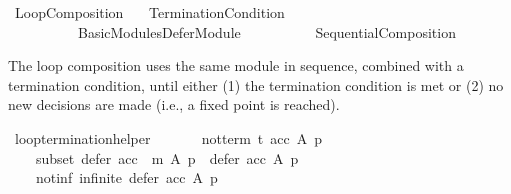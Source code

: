 %
\begin{isabellebody}%
%
%
\isadelimdocument
\isanewline
%
\endisadelimdocument
%
\isatagdocument
\isanewline
\isanewline
%
\isamarkuptrue%
%
\endisatagdocument
{\isafolddocument}%
%
\isadelimdocument
%
\endisadelimdocument
%
\isadelimtheory
%
\endisadelimtheory
%
\isatagtheory
{}\isamarkupfalse%
\ Loop{\isacharunderscore}{\kern0pt}Composition\isanewline
\ \ \ {\isachardoublequoteopen}{\isachardot}{\kern0pt}{\isachardot}{\kern0pt}{\isacharslash}{\kern0pt}Termination{\isacharunderscore}{\kern0pt}Condition{\isachardoublequoteclose}\isanewline
\ \ \ \ \ \ \ \ \ \ {\isachardoublequoteopen}{\isachardot}{\kern0pt}{\isachardot}{\kern0pt}{\isacharslash}{\kern0pt}Basic{\isacharunderscore}{\kern0pt}Modules{\isacharslash}{\kern0pt}Defer{\isacharunderscore}{\kern0pt}Module{\isachardoublequoteclose}\isanewline
\ \ \ \ \ \ \ \ \ \ Sequential{\isacharunderscore}{\kern0pt}Composition\isanewline
\isanewline
{}%
\endisatagtheory
{\isafoldtheory}%
%
\isadelimtheory
%
\endisadelimtheory
%
\begin{isamarkuptext}%
The loop composition uses the same module in sequence,
combined with a termination condition, until either
  (1) the termination condition is met or
  (2) no new decisions are made (i.e., a fixed point is reached).%
\end{isamarkuptext}\isamarkuptrue%
%
\isadelimdocument
%
\endisadelimdocument
%
\isatagdocument
%
\isamarkuptrue%
%
\endisatagdocument
{\isafolddocument}%
%
\isadelimdocument
%
\endisadelimdocument
{}\isamarkupfalse%
\ loop{\isacharunderscore}{\kern0pt}termination{\isacharunderscore}{\kern0pt}helper{\isacharcolon}{\kern0pt}\isanewline
\ \ \isanewline
\ \ \ \ not{\isacharunderscore}{\kern0pt}term{\isacharcolon}{\kern0pt}\ {\isachardoublequoteopen}{\isasymnot}t\ {\isacharparenleft}{\kern0pt}acc\ A\ p{\isacharparenright}{\kern0pt}{\isachardoublequoteclose}\ \isanewline
\ \ \ \ subset{\isacharcolon}{\kern0pt}\ {\isachardoublequoteopen}defer\ {\isacharparenleft}{\kern0pt}acc\ {\isasymtriangleright}\ m{\isacharparenright}{\kern0pt}\ A\ p\ {\isasymsubset}\ defer\ acc\ A\ p{\isachardoublequoteclose}\ \isanewline
\ \ \ \ not{\isacharunderscore}{\kern0pt}inf{\isacharcolon}{\kern0pt}\ {\isachardoublequoteopen}{\isasymnot}infinite\ {\isacharparenleft}{\kern0pt}defer\ acc\ A\ p{\isacharparenright}{\kern0pt}{\isachardoublequoteclose}\isanewline

\end{isabellebody}
